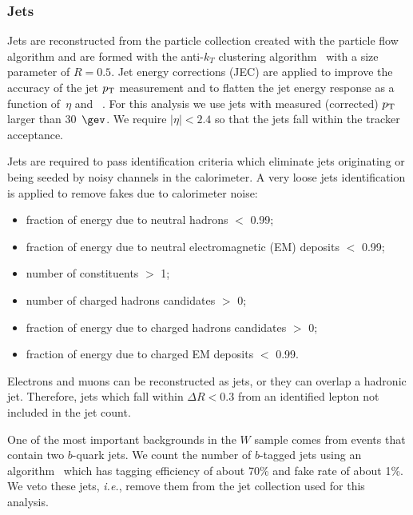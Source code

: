 \subsubsection{Jets\label{sec:jet}} 
Jets are reconstructed from the particle collection created
with the particle flow  algorithm  and are
formed with the anti-$k_T$ clustering algorithm~\cite{ref:antikt}
with a size parameter of $R = 0.5$.   Jet energy corrections (JEC)
are applied to improve the accuracy of the jet $p_{\mathrm{T}}$ measurement
and to flatten the jet energy response as a function
of~$\eta$ and \pt~\cite{jme-10-010}.
For this analysis we use jets with measured (corrected) $p_{\mathrm{T}}$  
larger than 30~$\gev$. 
We require $|\eta| < 2.4$ so that the jets fall within the
tracker acceptance.  


\par
Jets are required to pass  identification
criteria which eliminate jets originating or being seeded by
noisy channels in the calorimeter\cite{Chatrchyan:2009hy}. 
A very loose jets identification is applied to remove fakes
due to calorimeter noise:
\begin{itemize}
\item fraction of energy due to neutral hadrons $<$ 0.99;
\item fraction of energy due to neutral electromagnetic (EM) deposits $<$ 0.99;
\item number of constituents $>$ 1;
\item number of charged hadrons candidates $>$ 0;
\item fraction of energy due to charged hadrons candidates $>$ 0;
\item fraction of energy due to charged EM deposits $<$ 0.99.
\end{itemize}


Electrons and muons can be reconstructed as jets, or they can overlap
a hadronic jet.  Therefore, jets which fall within $\Delta R < 0.3$
from an identified lepton not included
in the jet count.   

\par
One of the most important backgrounds in the $W$ sample
comes from \ttbar events that contain two $b$-quark jets.
We count the number of $b$-tagged jets 
using an algorithm~\cite{btv-10-001} which 
has tagging efficiency of about 70\% and fake rate of about 1\%.
We veto these jets, \textit{i.e.}, remove them from the jet collection 
used for this analysis.

